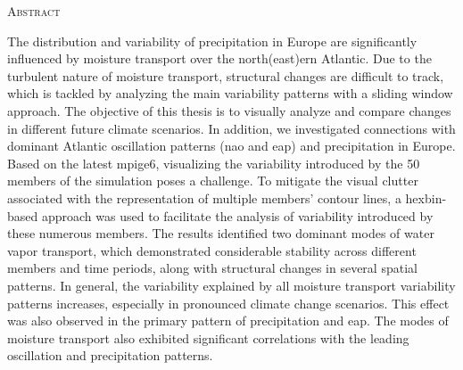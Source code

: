 \begin{center}
  \textsc{Abstract}
\end{center}
%
\noindent
%
The distribution and variability of precipitation in Europe are significantly influenced by moisture transport over the north(east)ern Atlantic.
Due to the turbulent nature of moisture transport, structural changes are difficult to track, which is tackled by analyzing the main variability patterns with a sliding window approach.
The objective of this thesis is to visually analyze and compare changes in different future climate scenarios. 
In addition, we investigated connections with dominant Atlantic oscillation patterns (\acf{nao} and \acf{eap}) and precipitation in Europe.
Based on the latest \acl{mpige6}, visualizing the variability introduced by the 50 members of the simulation poses a challenge.
To mitigate the visual clutter associated with the representation of multiple members' contour lines, a hexbin-based approach was used to facilitate the analysis of variability introduced by these numerous members.
The results identified two dominant modes of water vapor transport, which demonstrated considerable stability across different members and time periods, along with structural changes in several spatial patterns. 
In general, the variability explained by all moisture transport variability patterns increases, especially in pronounced climate change scenarios. 
This effect was also observed in the primary pattern of precipitation and \ac{eap}.
The modes of moisture transport also exhibited significant correlations with the leading oscillation and precipitation patterns. 

